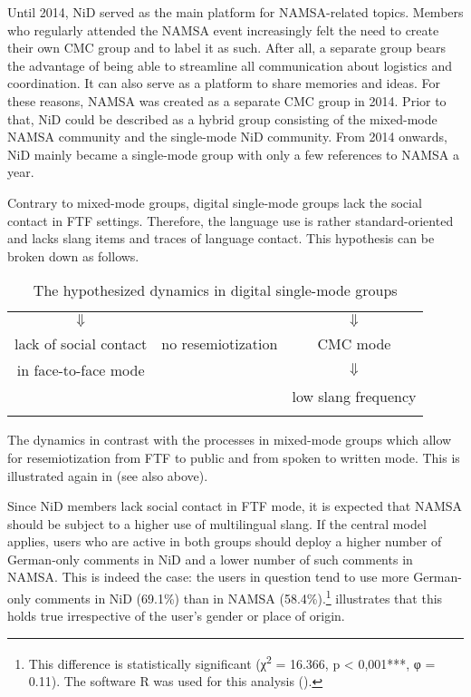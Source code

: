 \documentclass[output=paper]{langsci/langscibook}
\begin{document}
Until 2014, NiD served as the main platform for NAMSA-related topics. Members who regularly attended the NAMSA event increasingly felt the need to create their own CMC group and to label it as such. After all, a separate group bears the advantage of being able to streamline all communication about logistics and coordination. It can also serve as a platform to share memories and ideas. For these reasons, NAMSA was created as a separate CMC group in 2014. Prior to that, NiD could be described as a hybrid group consisting of the mixed-mode NAMSA community and the single-mode NiD community. From 2014 onwards, NiD mainly became a single-mode group with only a few references to NAMSA a year.

Contrary to mixed-mode groups, digital single-mode groups lack the social contact in FTF settings. Therefore, the language use is rather standard-oriented and lacks slang items and traces of language contact. This hypothesis can be broken down as follows.

 
\begin{table} 
\begin{tabularx}{0.8\textwidth}{ccc}
\lsptoprule
\multicolumn{3}{c}{digital single-mode groups}\\
\midrule
${\Downarrow}$ & & ${\Downarrow}$\\
lack of social contact & no resemiotization & CMC mode\\
in face-to-face mode & & ${\Downarrow}$\\
& & low slang frequency\\
\lspbottomrule
\end{tabularx}
\caption{The hypothesized dynamics in digital single-mode groups}
\label{tab:radke:3}
\end{table}  

The dynamics in  contrast with the processes in mixed-mode groups which allow for resemiotization from FTF to public and from spoken to written mode. This is illustrated again in  (see also  above).


Since NiD members lack social contact in FTF mode, it is expected that NAMSA should be subject to a higher use of multilingual slang. If the central model applies, users who are active in both groups should deploy a higher number of German-only comments in NiD and a lower number of such comments in NAMSA. This is indeed the case: the users in question tend to use more German-only comments in NiD (69.1\%) than in NAMSA (58.4\%).\footnote{This difference is statistically significant (χ\textsuperscript{2} = 16.366, p < 0,001***, φ = 0.11). The software R was used for this analysis (\citealt{r_core_team_language_2019}).}  illustrates that this holds true irrespective of the user’s gender or place of origin.\largerpage[1.5]
\end{document}
